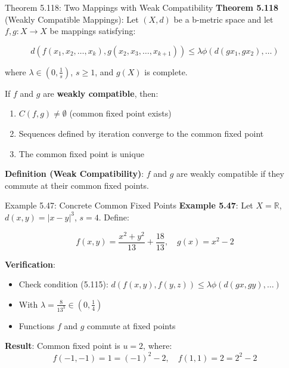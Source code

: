 \documentclass[aspectratio=169,10pt]{beamer}
\begin{document}
\begin{frame}{Theorem 5.118: Two Mappings with Weak Compatibility}
    \textbf{Theorem 5.118} (Weakly Compatible Mappings): Let $(X, d)$ be a b-metric space and let $f, g: X \to X$ be mappings satisfying:

    \medskip

    \[
    d(f(x_1, x_2, \ldots, x_k), g(x_2, x_3, \ldots, x_{k+1})) \leq \lambda\phi(d(gx_1, gx_2), \ldots)
    \]

    where $\lambda \in (0, \frac{1}{s})$, $s \geq 1$, and $g(X)$ is complete.

    \medskip

    If $f$ and $g$ are \textbf{weakly compatible}, then:
    \begin{enumerate}
        \item $C(f, g) \neq \emptyset$ (common fixed point exists)
        \item Sequences defined by iteration converge to the common fixed point
        \item The common fixed point is unique
    \end{enumerate}

    \medskip
    \small
    \textbf{Definition (Weak Compatibility)}: $f$ and $g$ are weakly compatible if they commute at their common fixed points.
\end{frame}

\begin{frame}{Example 5.47: Concrete Common Fixed Points}
    \textbf{Example 5.47}: Let $X = \mathbb{R}$, $d(x,y) = |x-y|^3$, $s=4$. Define:

    \[
    f(x, y) = \frac{x^2 + y^2}{13} + \frac{18}{13}, \quad g(x) = x^2 - 2
    \]

    \medskip

    \textbf{Verification}:
    \begin{itemize}
        \item Check condition (5.115): $d(f(x,y), f(y,z)) \leq \lambda \phi(d(gx, gy), \ldots)$
        \item With $\lambda = \frac{8}{13^3} \in (0, \frac{1}{4})$
        \item Functions $f$ and $g$ commute at fixed points
    \end{itemize}

    \medskip

    \textbf{Result}: Common fixed point is $u = 2$, where:
    \[
    f(-1, -1) = 1 = (-1)^2 - 2, \quad f(1, 1) = 2 = 2^2 - 2
    \]
\end{frame}
\end{document}
